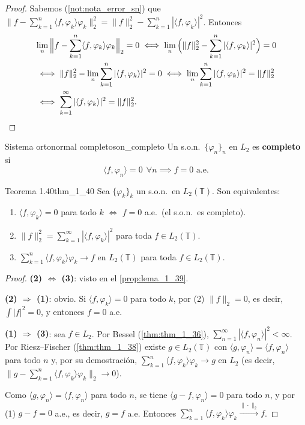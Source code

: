 \begin{proof}
Sabemos (\cref{not:nota_error_sn}) que $\big\|f - \sum_{k=1}^{n}\langle f, \varphi_k\rangle\varphi_k\big\|_2^2 = \|f\|_2^2 - \sum_{k=1}^{n}|\langle f, \varphi_k\rangle|^2$. Entonces
\begin{align*}
&\lim_n\Big\|f - \sum_{k=1}^{n}\langle f, \varphi_k\rangle\varphi_k\Big\|_2 = 0
\iff \lim_n\Big(\|f\|_2^2 - \sum_{k=1}^{n}|\langle f, \varphi_k\rangle|^2\Big) = 0 \\
&\iff \|f\|_2^2 - \lim_n\sum_{k=1}^{n}|\langle f, \varphi_k\rangle|^2 = 0
\iff \lim_n\sum_{k=1}^{n}|\langle f, \varphi_k\rangle|^2 = \|f\|_2^2 \\
&\iff \sum_{k=1}^{\infty}|\langle f, \varphi_k\rangle|^2 = \|f\|_2^2. \qedhere
\end{align*}
\end{proof}

\begin{definicion}{Sistema ortonormal completo}{son_completo}
Un s.o.n.\ $\{\varphi_n\}_n$ en $L_2$ es \textbf{completo} si
\[
\langle f, \varphi_n\rangle = 0 \ \ \forall n \implies f = 0 \text{ a.e.}
\]
\end{definicion}

\begin{teorema}{Teorema 1.40}{thm_1_40}
Sea $\{\varphi_k\}_k$ un s.o.n.\ en $L_2(\mathbb{T})$. Son equivalentes:
\begin{enumerate}
\item[(1)] $\langle f, \varphi_k\rangle = 0$ para todo $k$ $\iff$ $f = 0$ a.e.\ (el s.o.n.\ es completo).
\item[(2)] $\|f\|_2^2 = \sum_{k=1}^{\infty}|\langle f, \varphi_k\rangle|^2$ para toda $f \in L_2(\mathbb{T})$.
\item[(3)] $\sum_{k=1}^{n}\langle f, \varphi_k\rangle\varphi_k \to f$ en $L_2(\mathbb{T})$ para toda $f \in L_2(\mathbb{T})$.
\end{enumerate}
\end{teorema}

\begin{proof}
\textbf{(2) $\Leftrightarrow$ (3)}: visto en el \cref{prop:lema_1_39}.

\textbf{(2) $\Rightarrow$ (1)}: obvio. Si $\langle f, \varphi_k\rangle = 0$ para todo $k$, por (2) $\|f\|_2 = 0$, es decir, $\int|f|^2 = 0$, y entonces $f = 0$ a.e.

\textbf{(1) $\Rightarrow$ (3)}: sea $f \in L_2$. Por Bessel (\cref{thm:thm_1_36}), $\sum_{n=1}^{\infty}|\langle f, \varphi_n\rangle|^2 < \infty$. Por Riesz--Fischer (\cref{thm:thm_1_38}) existe $g \in L_2(\mathbb{T})$ con $\langle g, \varphi_n\rangle = \langle f, \varphi_n\rangle$ para todo $n$ y, por su demostración, $\sum_{k=1}^{n}\langle f, \varphi_k\rangle\varphi_k \to g$ en $L_2$ (es decir, $\|g - \sum_{k=1}^{n}\langle f, \varphi_k\rangle\varphi_k\|_2 \to 0$).

Como $\langle g, \varphi_n\rangle = \langle f, \varphi_n\rangle$ para todo $n$, se tiene $\langle g - f, \varphi_n\rangle = 0$ para todo $n$, y por (1) $g - f = 0$ a.e., es decir, $g = f$ a.e. Entonces $\sum_{k=1}^{n}\langle f, \varphi_k\rangle\varphi_k \xrightarrow{\|\cdot\|_2} f$.
\end{proof}

